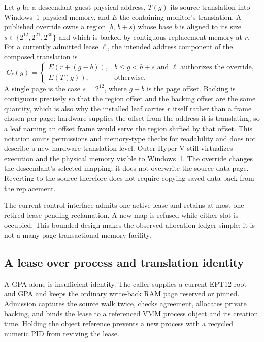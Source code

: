 Let $g$ be a descendant guest-physical address, $T(g)$ its source translation
into Windows~1 physical memory, and $E$ the containing monitor's translation.
A published override owns a region $[b,\,b+s)$ whose base $b$ is aligned to its
size $s \in \{2^{12}, 2^{21}, 2^{30}\}$ and which is backed by contiguous
replacement memory at $r$. For a currently admitted lease $\ell$, the intended
address component of the composed translation is
\begin{equation}
  C_{\ell}(g)=
  \begin{cases}
    E(r + (g - b)), & b \le g < b+s
      \text{ and } \ell \text{ authorizes the override},\\
    E(T(g)), & \text{otherwise}.
  \end{cases}
  \label{eq:compose}
\end{equation}
A single page is the case $s = 2^{12}$, where $g-b$ is the page offset. Backing
is contiguous precisely so that the region offset and the backing offset are the
same quantity, which is also why the installed leaf carries $r$ itself rather
than a frame chosen per page: hardware supplies the offset from the address it
is translating, so a leaf naming an offset frame would serve the region shifted
by that offset. This notation omits permissions and memory-type checks for
readability and does not describe a new hardware translation level. Outer Hyper-V still
virtualizes execution and the physical memory visible to Windows~1. The
override changes the descendant's selected mapping; it does not overwrite
the source data page. Reverting to the source therefore does not require
copying saved data back from the replacement.

The current control interface admits one active lease and retains at most one
retired lease pending reclamation. A new map is refused while either slot is
occupied. This bounded design makes the observed allocation ledger simple; it
is not a many-page transactional memory facility.

\subsection{A lease over process and translation identity}
\label{sec:lease}
A GPA alone is insufficient identity. The caller supplies a current EPT12 root
and GPA and keeps the ordinary write-back RAM page reserved or pinned. Admission
captures the source walk twice, checks agreement, allocates private backing,
and binds the lease to a referenced VMM process object and its creation time.
Holding the object reference prevents a new process with a recycled numeric
PID from reviving the lease.

